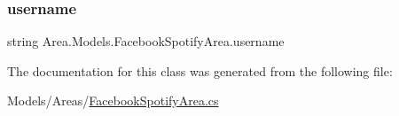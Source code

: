 \mbox{\label{classArea_1_1Models_1_1FacebookSpotifyArea_a50cb6f7d6d1d44a1c5ddd5997597fcab}} 
\subsubsection{\texorpdfstring{username}{username}}
{\footnotesize\ttfamily string Area.\+Models.\+Facebook\+Spotify\+Area.\+username\hspace{0.3cm}{\ttfamily [private]}}



The documentation for this class was generated from the following file\+:\begin{DoxyCompactItemize}
\item 
Models/\+Areas/\mbox{\hyperlink{FacebookSpotifyArea_8cs}{Facebook\+Spotify\+Area.\+cs}}\end{DoxyCompactItemize}

